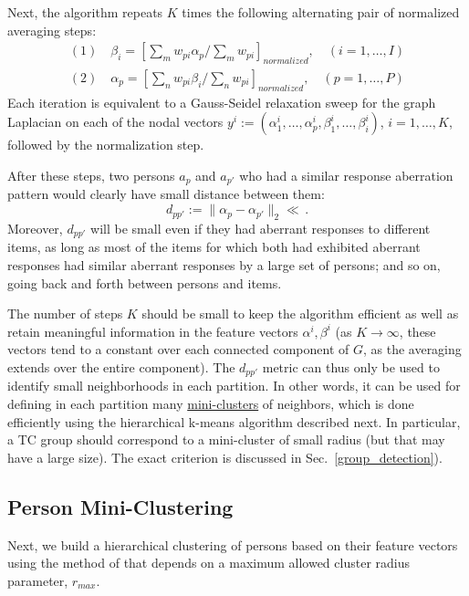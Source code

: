 \documentclass{article}
\begin{document}
Next, the algorithm repeats $K$ times the following alternating pair of normalized averaging steps:
\begin{equation}
\begin{split}
(1) \quad \beta_i = \left[ \sum_m w_{pi} \alpha_p / \sum_m w_{pi} \right]_{normalized}, \quad (i=1,\ldots,I) \\
(2) \quad \alpha_p = \left[ \sum_n w_{pi} \beta_i / \sum_n w_{pi} \right]_{normalized}, \quad (p=1,\ldots,P) 
\end{split}
\label{eqn:bistep}
\end{equation}
Each iteration is equivalent to a Gauss-Seidel relaxation sweep for the graph Laplacian \cite{lamg} on each of the nodal vectors $y^i := (\alpha_1^i,\dots,\alpha_p^i,\beta_1^i,\dots,\beta_i^i)$, $i=1,\dots,K$, followed by the normalization step.

After these steps, two persons $a_p$ and $a_{p'}$ who had a similar response aberration pattern would clearly have small distance between them:
\begin{equation}
d_{pp'} := \|\alpha_p - \alpha_{p'} \|_2 \ll\,.
\end{equation}
Moreover, $d_{pp'}$ will be small even if they had aberrant responses to different items, as long as most of the items for which both had exhibited aberrant responses had similar aberrant responses by a large set of persons; and so on, going back and forth between persons and items.

The number of steps $K$ should be small to keep the algorithm efficient as well as retain meaningful information in the feature vectors $\alpha^i, \beta^i$ (as $K \rightarrow \infty$, these vectors tend to a constant over each connected component of $G$, as the averaging extends over the entire component). The $d_{pp'}$ metric can thus only be used to identify small neighborhoods in each partition. In other words, it can be used for defining in each partition many \underline{mini-clusters} of neighbors, which is done efficiently using the hierarchical k-means algorithm described next. In particular, a TC group should correspond to a mini-cluster of small radius (but that may have a large size). The exact criterion is discussed in Sec.~\ref{group_detection}).

\subsection{Person Mini-Clustering}
\label{miniclustering}
Next, we build a hierarchical clustering of persons based on their feature vectors using the method of \cite{miniclustering} that depends on a maximum allowed cluster radius parameter, $r_{max}$.
\end{document}

